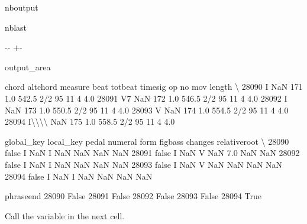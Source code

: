 \documentclass[letterpaper,10pt,english]{sphinxmanual}
\newlength\nbsphinxcodecellspacing
\begin{document}
\begin{sphinxuseclass}{nboutput}
\begin{sphinxuseclass}{nblast}
{

\kern-\sphinxverbatimsmallskipamount\kern-\baselineskip
\kern+\FrameHeightAdjust\kern-\fboxrule
\vspace{\nbsphinxcodecellspacing}

\begin{sphinxuseclass}{output_area}
\begin{sphinxuseclass}{}


\begin{sphinxVerbatim}[commandchars=\\\{\}]
\llap{\color{nbsphinxout}[7]:\,\hspace{\fboxrule}\hspace{\fboxsep}}       chord altchord  measure  beat  totbeat timesig  op  no  mov  length  \textbackslash{}
28090      I      NaN      171   1.0    542.5     2/2  95  11    4     4.0
28091     V7      NaN      172   1.0    546.5     2/2  95  11    4     4.0
28092      I      NaN      173   1.0    550.5     2/2  95  11    4     4.0
28093      V      NaN      174   1.0    554.5     2/2  95  11    4     4.0
28094  I\textbackslash{}\textbackslash{}\textbackslash{}\textbackslash{}      NaN      175   1.0    558.5     2/2  95  11    4     4.0

      global\_key local\_key pedal numeral form  figbass changes relativeroot  \textbackslash{}
28090      false         I   NaN       I  NaN      NaN     NaN          NaN
28091      false         I   NaN       V  NaN      7.0     NaN          NaN
28092      false         I   NaN       I  NaN      NaN     NaN          NaN
28093      false         I   NaN       V  NaN      NaN     NaN          NaN
28094      false         I   NaN       I  NaN      NaN     NaN          NaN

       phraseend
28090      False
28091      False
28092      False
28093      False
28094       True
\end{sphinxVerbatim}



\end{sphinxuseclass}
\end{sphinxuseclass}
}

\end{sphinxuseclass}
\end{sphinxuseclass}
\sphinxAtStartPar
Call the variable  in the next cell.
\end{document}

